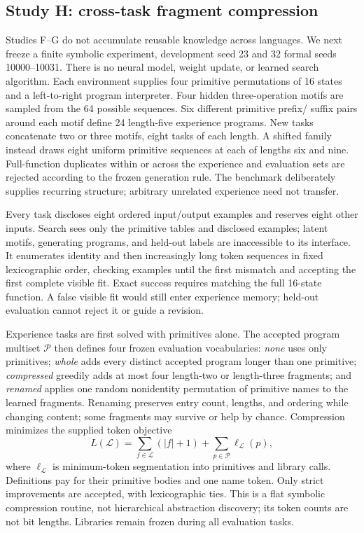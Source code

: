 \documentclass[11pt]{article}
\begin{document}
\subsection{Study H: cross-task fragment compression}
Studies F--G do not accumulate reusable knowledge across languages. We next
freeze a finite symbolic experiment, development seed 23 and 32 formal seeds
10000--10031. There is no neural model, weight update, or learned search
algorithm. Each environment supplies four primitive permutations of 16 states
and a left-to-right program interpreter. Four hidden three-operation motifs
are sampled from the 64 possible sequences. Six different primitive prefix/
suffix pairs around each motif define 24 length-five experience programs.
New tasks concatenate two or three motifs, eight tasks of each length. A
shifted family instead draws eight uniform primitive sequences at each of
lengths six and nine. Full-function duplicates within or across the experience
and evaluation sets are rejected according to the frozen generation rule.
The benchmark deliberately supplies recurring structure; arbitrary unrelated
experience need not transfer.

Every task discloses eight ordered input/output examples and reserves eight
other inputs. Search sees only the primitive tables and disclosed examples;
latent motifs, generating programs, and held-out labels are inaccessible to
its interface. It enumerates identity and then increasingly long token
sequences in fixed lexicographic order, checking examples until the first
mismatch and accepting the first complete visible fit. Exact success requires
matching the full 16-state function. A false visible fit would still enter
experience memory; held-out evaluation cannot reject it or guide a revision.

Experience tasks are first solved with primitives alone. The accepted program
multiset $\mathcal P$ then defines four frozen evaluation vocabularies:
\emph{none} uses only primitives; \emph{whole} adds every distinct accepted
program longer than one primitive; \emph{compressed} greedily adds at most
four length-two or length-three fragments; and \emph{renamed} applies one
random nonidentity permutation of primitive names to the learned fragments.
Renaming preserves entry count, lengths, and ordering while changing content;
some fragments may survive or help by chance. Compression minimizes the
supplied token objective
\[
 L(\mathcal L)=\sum_{f\in\mathcal L}(|f|+1)
                  +\sum_{p\in\mathcal P}\ell_{\mathcal L}(p),
\]
where $\ell_{\mathcal L}$ is minimum-token segmentation into primitives and
library calls. Definitions pay for their primitive bodies and one name token.
Only strict improvements are accepted, with lexicographic ties. This is a
flat symbolic compression routine, not hierarchical abstraction discovery;
its token counts are not bit lengths. Libraries remain frozen during all
evaluation tasks.
\end{document}
